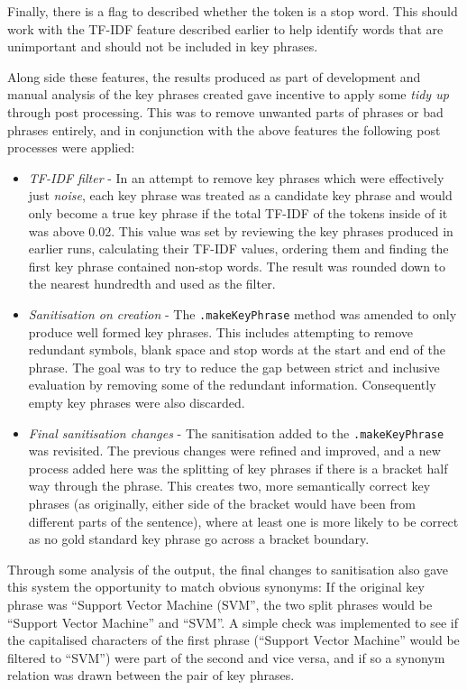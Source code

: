 Finally, there is a flag to described whether the token is a stop word. This should work with the TF-IDF feature described earlier to help identify words that are unimportant and should not be included in key phrases.

Along side these features, the results produced as part of development and manual analysis of the key phrases created gave incentive to apply some \textit{tidy up} through post processing. This was to remove unwanted parts of phrases or bad phrases entirely, and in conjunction with the above features the following post processes were applied:

\begin{itemize}
	\item \textit{TF-IDF filter} - In an attempt to remove key phrases which were effectively just \textit{noise}, each key phrase was treated as a candidate key phrase and would only become a true key phrase if the total TF-IDF of the tokens inside of it was above 0.02. This value was set by reviewing the key phrases produced in earlier runs, calculating their TF-IDF values, ordering them and finding the first key phrase contained non-stop words. The result was rounded down to the nearest hundredth and used as the filter.
	\item \textit{Sanitisation on creation} - The \texttt{.makeKeyPhrase} method was amended to only produce well formed key phrases. This includes attempting to remove redundant symbols, blank space and stop words at the start and end of the phrase. The goal was to try to reduce the gap between strict and inclusive evaluation by removing some of the redundant information. Consequently empty key phrases were also discarded.
	\item \textit{Final sanitisation changes} - The sanitisation added to the \texttt{.makeKeyPhrase} was revisited. The previous changes were refined and improved, and a new process added here was the splitting of key phrases if there is a bracket half way through the phrase. This creates two, more semantically correct key phrases (as originally, either side of the bracket would have been from different parts of the sentence), where at least one is more likely to be correct as no gold standard key phrase go across a bracket boundary. 
\end{itemize}

Through some analysis of the output, the final changes to sanitisation also gave this system the opportunity to match obvious synonyms: If the original key phrase was ``Support Vector Machine (SVM'', the two split phrases would be ``Support Vector Machine'' and ``SVM''. A simple check was implemented to see if the capitalised characters of the first phrase (``Support Vector Machine'' would be filtered to ``SVM'') were part of the second and vice versa, and if so a synonym relation was drawn between the pair of key phrases. 

